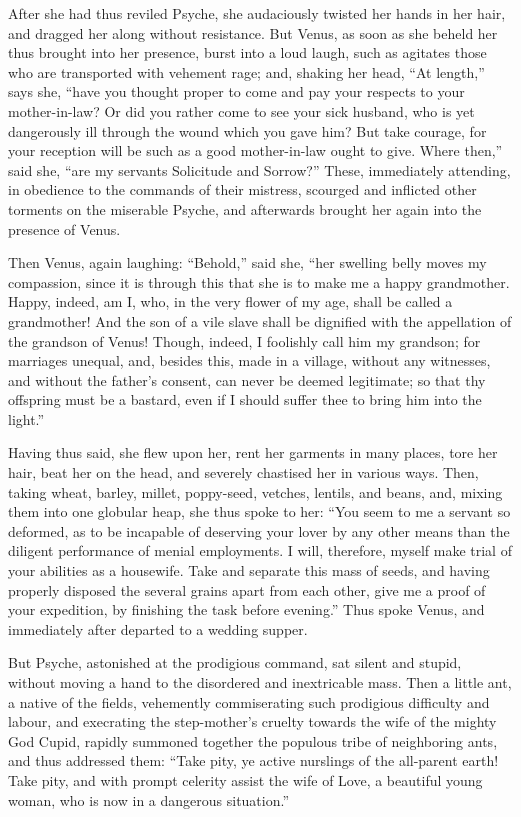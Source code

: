 \documentclass{article}
\begin{document}
After she had thus reviled Psyche, she audaciously twisted her hands in her
hair, and dragged her along without resistance. But Venus, as soon as she
beheld her thus brought into her presence, burst into a loud laugh, such as
agitates those who are transported with vehement rage; and, shaking her head,
``At length,'' says she, ``have you thought proper to come and pay your
respects to your mother-in-law? Or did you rather come to see your sick
husband, who is yet dangerously ill through the wound which you gave him? But
take courage, for your reception will be such as a good mother-in-law ought to
give. Where then,'' said she, ``are my servants Solicitude and Sorrow?'' These,
immediately attending, in obedience to the commands of their mistress, scourged
and inflicted other torments on the miserable Psyche, and afterwards brought
her again into the presence of Venus.

Then Venus, again laughing: ``Behold,'' said she, ``her swelling belly moves my
compassion, since it is through this that she is to make me a happy
grandmother. Happy, indeed, am I, who, in the very flower of my age, shall be
called a grandmother! And the son of a vile slave shall be dignified with the
appellation of the grandson of Venus! Though, indeed, I foolishly call him my
grandson; for marriages unequal, and, besides this, made in a village, without
any witnesses, and without the father's consent, can never be deemed
legitimate; so that thy offspring must be a bastard, even if I should suffer
thee to bring him into the light.''

Having thus said, she flew upon her, rent her garments in many places, tore her
hair, beat her on the head, and severely chastised her in various ways. Then,
taking wheat, barley, millet, poppy-seed, vetches, lentils, and beans, and,
mixing them into one globular heap, she thus spoke to her: ``You seem to me a
servant so deformed, as to be incapable of deserving your lover by any other
means than the diligent performance of menial employments. I will, therefore,
myself make trial of your abilities as a housewife. Take and separate this mass
of seeds, and having properly disposed the several grains apart from each
other, give me a proof of your expedition, by finishing the task before
evening.'' Thus spoke Venus, and immediately after departed to a wedding
supper.

But Psyche, astonished at the prodigious command, sat silent and stupid,
without moving a hand to the disordered and inextricable mass. Then a little
ant, a native of the fields, vehemently commiserating such prodigious
difficulty and labour, and execrating the step-mother's cruelty towards the
wife of the mighty God Cupid, rapidly summoned together the populous tribe of
neighboring ants, and thus addressed them: ``Take pity, ye active nurslings of
the all-parent earth! Take pity, and with prompt celerity assist the wife of
Love, a beautiful young woman, who is now in a dangerous situation.''
\end{document}
